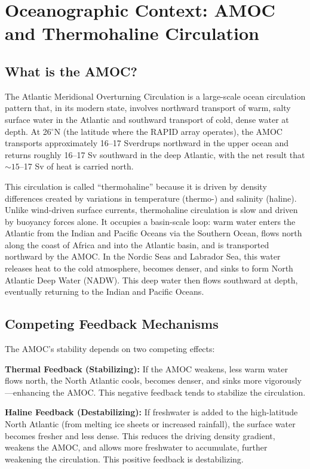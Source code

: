 \documentclass[12pt,letterpaper]{article}
\begin{document}
\section{Oceanographic Context: AMOC and Thermohaline Circulation}

\subsection{What is the AMOC?}

The Atlantic Meridional Overturning Circulation is a large-scale ocean circulation pattern that, in its modern state, involves northward transport of warm, salty surface water in the Atlantic and southward transport of cold, dense water at depth. At 26$^\circ$N (the latitude where the RAPID array operates), the AMOC transports approximately 16--17 Sverdrups northward in the upper ocean and returns roughly 16--17 Sv southward in the deep Atlantic, with the net result that $\sim 15$--17 Sv of heat is carried north.

This circulation is called ``thermohaline'' because it is driven by density differences created by variations in temperature (thermo-) and salinity (haline). Unlike wind-driven surface currents, thermohaline circulation is slow and driven by buoyancy forces alone. It occupies a basin-scale loop: warm water enters the Atlantic from the Indian and Pacific Oceans via the Southern Ocean, flows north along the coast of Africa and into the Atlantic basin, and is transported northward by the AMOC. In the Nordic Seas and Labrador Sea, this water releases heat to the cold atmosphere, becomes denser, and sinks to form North Atlantic Deep Water (NADW). This deep water then flows southward at depth, eventually returning to the Indian and Pacific Oceans.

\subsection{Competing Feedback Mechanisms}

The AMOC's stability depends on two competing effects:

\noindent \textbf{Thermal Feedback (Stabilizing):} If the AMOC weakens, less warm water flows north, the North Atlantic cools, becomes denser, and sinks more vigorously---enhancing the AMOC. This negative feedback tends to stabilize the circulation.

\noindent \textbf{Haline Feedback (Destabilizing):} If freshwater is added to the high-latitude North Atlantic (from melting ice sheets or increased rainfall), the surface water becomes fresher and less dense. This reduces the driving density gradient, weakens the AMOC, and allows more freshwater to accumulate, further weakening the circulation. This positive feedback is destabilizing.
\end{document}
